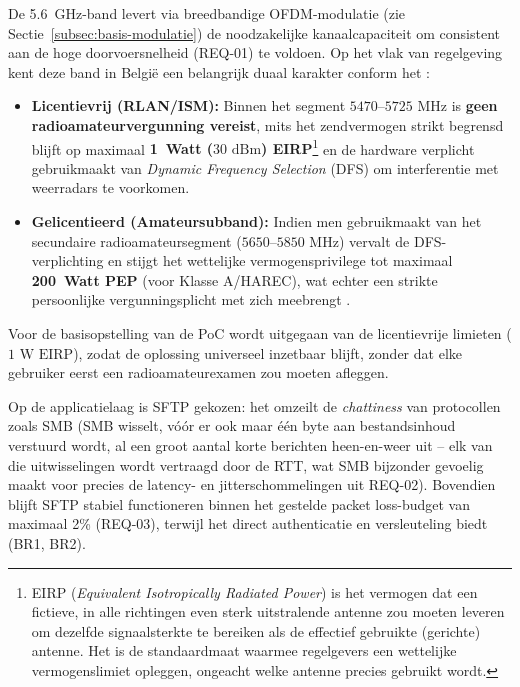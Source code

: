 De 5.6~GHz-band levert via breedbandige OFDM-modulatie (zie Sectie~\ref{subsec:basis-modulatie}) de noodzakelijke kanaalcapaciteit om consistent aan de hoge doorvoersnelheid (REQ-01) te voldoen. Op het vlak van regelgeving kent deze band in België een belangrijk duaal karakter conform het \textcite{BIPT2019}:
\begin{itemize}
    \item \textbf{Licentievrij (RLAN/ISM):} Binnen het segment $5470\text{--}5725\text{ MHz}$ is \textbf{geen radioamateurvergunning vereist}, mits het zendvermogen strikt begrensd blijft op maximaal \textbf{1~Watt ($30\text{ dBm}$) EIRP}\footnote{EIRP (\textit{Equivalent Isotropically Radiated Power}) is het vermogen dat een fictieve, in alle richtingen even sterk uitstralende antenne zou moeten leveren om dezelfde signaalsterkte te bereiken als de effectief gebruikte (gerichte) antenne. Het is de standaardmaat waarmee regelgevers een wettelijke vermogenslimiet opleggen, ongeacht welke antenne precies gebruikt wordt.} en de hardware verplicht gebruikmaakt van \textit{Dynamic Frequency Selection} (DFS) om interferentie met weerradars te voorkomen.
    \item \textbf{Gelicentieerd (Amateursubband):} Indien men gebruikmaakt van het secundaire radioamateursegment ($5650\text{--}5850\text{ MHz}$) vervalt de DFS-verplichting en stijgt het wettelijke vermogensprivilege tot maximaal \textbf{200~Watt PEP} (voor Klasse A/HAREC), wat echter een strikte persoonlijke vergunningsplicht met zich meebrengt \autocite{UBAFrequenties}.
\end{itemize}
Voor de basisopstelling van de PoC wordt uitgegaan van de licentievrije limieten ($1\text{~W EIRP}$), zodat de oplossing universeel inzetbaar blijft, zonder dat elke gebruiker eerst een radioamateurexamen zou moeten afleggen.

Op de applicatielaag is SFTP gekozen: het omzeilt de \textit{chattiness} van protocollen zoals SMB (SMB wisselt, vóór er ook maar één byte aan bestandsinhoud verstuurd wordt, al een groot aantal korte berichten heen-en-weer uit -- elk van die uitwisselingen wordt vertraagd door de RTT, wat SMB bijzonder gevoelig maakt voor precies de latency- en jitterschommelingen uit REQ-02). Bovendien blijft SFTP stabiel functioneren binnen het gestelde packet loss-budget van maximaal 2\% (REQ-03), terwijl het direct authenticatie en versleuteling biedt (BR1, BR2).

